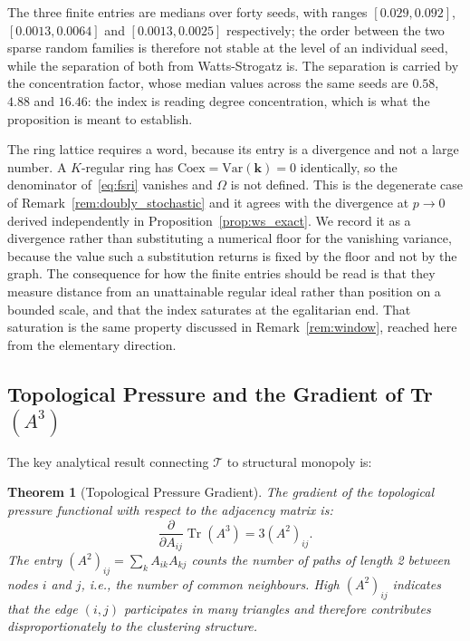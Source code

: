 \documentclass[11pt,a4paper]{article}
\newtheorem{theorem}{Theorem}
\begin{document}
The three finite entries are medians over forty seeds, with ranges
$[0.029, 0.092]$, $[0.0013, 0.0064]$ and $[0.0013, 0.0025]$ respectively; the
order between the two sparse random families is therefore not stable at the
level of an individual seed, while the separation of both from Watts-Strogatz
is. The separation is carried by the concentration factor, whose median values
across the same seeds are $0.58$, $4.88$ and $16.46$: the index is reading
degree concentration, which is what the proposition is meant to establish.

The ring lattice requires a word, because its entry is a divergence and not a
large number. A $K$-regular ring has $\mathrm{Coex} = \mathrm{Var}(\mathbf{k})
= 0$ identically, so the denominator of~\eqref{eq:fsri} vanishes and $\Omega$
is not defined. This is the degenerate case of Remark~\ref{rem:doubly_stochastic} and
it agrees with the divergence at $p \to 0$ derived independently in
Proposition~\ref{prop:ws_exact}. We record it as a divergence rather than
substituting a numerical floor for the vanishing variance, because the value
such a substitution returns is fixed by the floor and not by the graph. The
consequence for how the finite entries should be read is that they measure
distance from an unattainable regular ideal rather than position on a bounded
scale, and that the index saturates at the egalitarian end. That saturation is
the same property discussed in Remark~\ref{rem:window}, reached here from the
elementary direction.

\subsection{Topological Pressure and the Gradient of Tr$(A^3)$}

The key analytical result connecting $\mathcal{T}$ to structural
monopoly is:

\begin{theorem}[Topological Pressure Gradient]
\label{thm:pressure_gradient}
The gradient of the topological pressure functional with respect to the
adjacency matrix is:
\begin{equation}
\frac{\partial}{\partial A_{ij}} \operatorname{Tr}(A^3) = 3(A^2)_{ij}.
\label{eq:gradient}
\end{equation}
The entry $(A^2)_{ij} = \sum_k A_{ik}A_{kj}$ counts the number of
paths of length 2 between nodes $i$ and $j$, i.e., the number of
common neighbours. High $(A^2)_{ij}$ indicates that the edge $(i,j)$
participates in many triangles and therefore contributes
disproportionately to the clustering structure.
\end{theorem}
\end{document}
